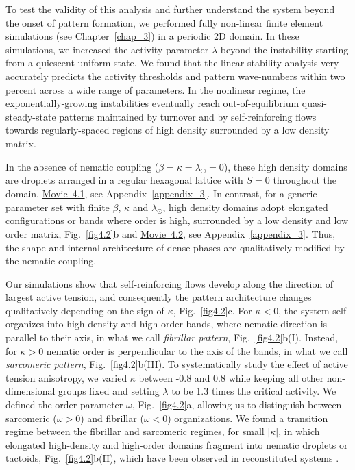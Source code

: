 To test the validity of this analysis and further understand the system beyond the onset of pattern formation, we performed fully non-linear finite element simulations (see Chapter~\ref{chap_3}) in a periodic 2D domain. In these simulations, we increased the activity parameter $\lambda$ beyond the instability starting from a quiescent uniform state. We found that the linear stability analysis very accurately predicts the activity thresholds and pattern wave-numbers within two percent across a wide range of parameters. In the nonlinear regime, the exponentially-growing instabilities eventually reach out-of-equilibrium quasi-steady-state patterns maintained by turnover and by self-reinforcing flows towards regularly-spaced regions of high density surrounded by a low density matrix. 

In the absence of nematic coupling ($\beta = \kappa = \lambda_\odot = 0$), these high density domains are droplets arranged in a regular hexagonal lattice with $S=0$ throughout the domain, \href{https://github.com/waleedmirzaPhD/movies_thesis.git}{Movie~4.1}, see Appendix~\ref{appendix_3}. In contrast, for a generic parameter set with finite $\beta$, $\kappa$ and  $\lambda_\odot$,  high density domains adopt elongated configurations or bands where order is high, surrounded by a low density and low order matrix, Fig.~\ref{fig4.2}b and \href{https://github.com/waleedmirzaPhD/movies_thesis.git}{Movie~4.2}, see Appendix~\ref{appendix_3}. Thus, the shape and internal architecture of dense phases are qualitatively modified by the nematic coupling.


Our simulations show that self-reinforcing flows develop along the direction of largest active tension, and consequently the pattern architecture changes qualitatively depending on the sign of $\kappa$, Fig.~\ref{fig4.2}c. For $\kappa<0$, the system self-organizes into high-density and high-order bands, where nematic direction is parallel to their axis, in what we call  \emph{fibrillar pattern}, Fig.~\ref{fig4.2}b(I). Instead, for $\kappa>0$ nematic order is perpendicular to the axis of the bands, in what we call \emph{sarcomeric pattern}, Fig.~\ref{fig4.2}b(III). To systematically study the effect of active tension anisotropy, we varied $\kappa$ between -0.8 and 0.8 while keeping all other non-dimensional groups fixed and  setting $\lambda$ to be 1.3 times the critical activity. We defined the order parameter $\omega$,  Fig.~\ref{fig4.2}a, allowing us to distinguish between sarcomeric ($\omega>0$) and fibrillar ($\omega<0$) organizations. We found a transition regime between the fibrillar and sarcomeric regimes, for small $\vert\kappa\vert$, in which elongated high-density and high-order domains fragment into  nematic droplets or tactoids, Fig.~\ref{fig4.2}b(II), which have been observed in reconstituted systems \cite{weirich2017,weirich2019}.

